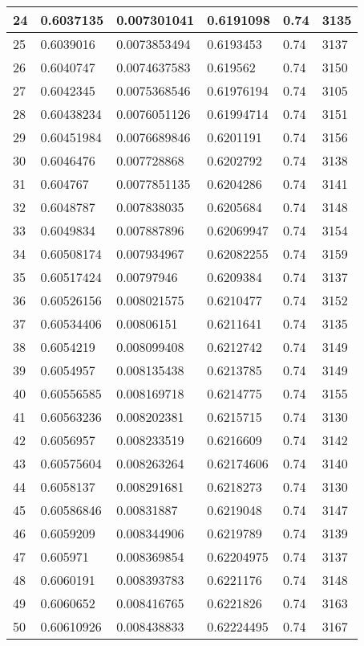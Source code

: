 \begin{longtable}{|l|l|l|l|l|l|}
24 & 0.6037135 & 0.007301041 & 0.6191098 & 0.74 & 3135 \\ \hline 
25 & 0.6039016 & 0.0073853494 & 0.6193453 & 0.74 & 3137 \\ \hline 
26 & 0.6040747 & 0.0074637583 & 0.619562 & 0.74 & 3150 \\ \hline 
27 & 0.6042345 & 0.0075368546 & 0.61976194 & 0.74 & 3105 \\ \hline 
28 & 0.60438234 & 0.0076051126 & 0.61994714 & 0.74 & 3151 \\ \hline 
29 & 0.60451984 & 0.0076689846 & 0.6201191 & 0.74 & 3156 \\ \hline 
30 & 0.6046476 & 0.007728868 & 0.6202792 & 0.74 & 3138 \\ \hline 
31 & 0.604767 & 0.0077851135 & 0.6204286 & 0.74 & 3141 \\ \hline 
32 & 0.6048787 & 0.007838035 & 0.6205684 & 0.74 & 3148 \\ \hline 
33 & 0.6049834 & 0.007887896 & 0.62069947 & 0.74 & 3154 \\ \hline 
34 & 0.60508174 & 0.007934967 & 0.62082255 & 0.74 & 3159 \\ \hline 
35 & 0.60517424 & 0.00797946 & 0.6209384 & 0.74 & 3137 \\ \hline 
36 & 0.60526156 & 0.008021575 & 0.6210477 & 0.74 & 3152 \\ \hline 
37 & 0.60534406 & 0.00806151 & 0.6211641 & 0.74 & 3135 \\ \hline 
38 & 0.6054219 & 0.008099408 & 0.6212742 & 0.74 & 3149 \\ \hline 
39 & 0.6054957 & 0.008135438 & 0.6213785 & 0.74 & 3149 \\ \hline 
40 & 0.60556585 & 0.008169718 & 0.6214775 & 0.74 & 3155 \\ \hline 
41 & 0.60563236 & 0.008202381 & 0.6215715 & 0.74 & 3130 \\ \hline 
42 & 0.6056957 & 0.008233519 & 0.6216609 & 0.74 & 3142 \\ \hline 
43 & 0.60575604 & 0.008263264 & 0.62174606 & 0.74 & 3140 \\ \hline 
44 & 0.6058137 & 0.008291681 & 0.6218273 & 0.74 & 3130 \\ \hline 
45 & 0.60586846 & 0.00831887 & 0.6219048 & 0.74 & 3147 \\ \hline 
46 & 0.6059209 & 0.008344906 & 0.6219789 & 0.74 & 3139 \\ \hline 
47 & 0.605971 & 0.008369854 & 0.62204975 & 0.74 & 3137 \\ \hline 
48 & 0.6060191 & 0.008393783 & 0.6221176 & 0.74 & 3148 \\ \hline 
49 & 0.6060652 & 0.008416765 & 0.6221826 & 0.74 & 3163 \\ \hline 
50 & 0.60610926 & 0.008438833 & 0.62224495 & 0.74 & 3167 \\ \hline 
\end{longtable}